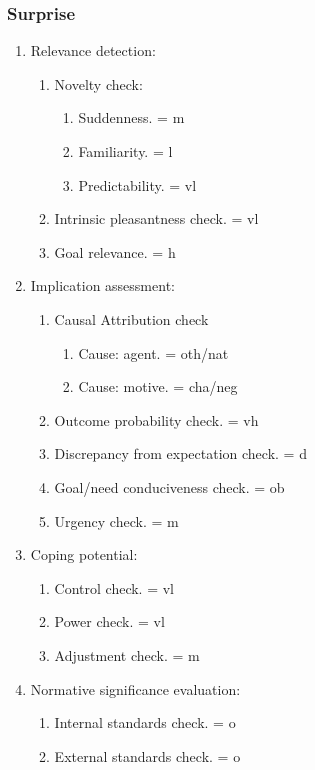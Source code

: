 {{\subsubsection{Surprise}

\begin{enumerate}
\item  Relevance detection:
\begin{enumerate}
\item  Novelty check:
\begin{enumerate}
\item  Suddenness. = m
\item  Familiarity. = l
\item  Predictability. = vl
\end{enumerate}
\item  Intrinsic pleasantness check. = vl
\item  Goal relevance. = h
\end{enumerate}
\item  Implication assessment:
\begin{enumerate}
\item  Causal Attribution check
\begin{enumerate}
\item  Cause: agent. = oth/nat
\item  Cause: motive. = cha/neg
\end{enumerate}
\item  Outcome probability check. = vh
\item  Discrepancy from expectation check. = d
\item  Goal/need conduciveness check. = ob
\item  Urgency check. = m
\end{enumerate}
\item  Coping potential:
\begin{enumerate}
\item  Control check. = vl
\item  Power check. = vl
\item  Adjustment check. = m
\end{enumerate}
\item  Normative significance evaluation:
\begin{enumerate}
\item  Internal standards check. = o
\item  External standards check. = o
\end{enumerate}
\end{enumerate}

}}
